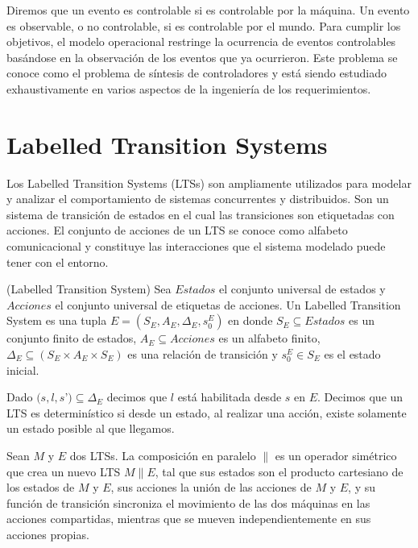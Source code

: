 Diremos que un evento es controlable si es controlable por la máquina. Un evento es observable, o no controlable, si es 
controlable por el mundo. 
Para cumplir los objetivos, el modelo operacional restringe la ocurrencia de eventos controlables basándose en la observación 
de los eventos que ya ocurrieron. 
Este problema se conoce como el problema de síntesis de controladores y está siendo estudiado exhaustivamente en varios 
aspectos de la ingeniería de los requerimientos.

\section{Labelled Transition Systems}
Los Labelled Transition Systems \cite{LTS} (LTSs) son ampliamente utilizados para modelar y analizar el comportamiento de 
sistemas concurrentes y distribuidos. Son un sistema de transición de estados en el cual las transiciones son etiquetadas 
con acciones. El conjunto de acciones de un LTS se conoce como alfabeto comunicacional y constituye las interacciones que 
el sistema modelado puede tener con el entorno.

\begin{definition}{(Labelled Transition System)}
Sea $Estados$ el conjunto universal de estados y $Acciones$ el conjunto universal de etiquetas de acciones. Un Labelled 
Transition System es una tupla $E = (S_{E}, A_{E}, \Delta_{E}, s_{0}^{E})$ en donde $S_{E} \subseteq Estados$ es un conjunto 
finito de estados, $A_{E} \subseteq Acciones$ es un alfabeto finito, $\Delta_{E} \subseteq (S_{E} \times A_{E} \times S_{E})$ es una 
relación de transición y $s_{0}^{E} \in S_{E}$ es el estado inicial.
\end{definition}

Dado $(s, l, s$’$) \subseteq \Delta_{E}$ decimos que $l$ está habilitada desde $s$ en $E$. Decimos que un LTS es 
determinístico si desde un estado, al realizar una acción, existe solamente un estado posible al que llegamos.

Sean $M$ y $E$ dos LTSs. La composición en paralelo $\parallel$ es un operador 
simétrico que crea un nuevo LTS $M \parallel E$, 
tal que sus estados son el producto cartesiano de los estados de $M$ y $E$, sus acciones la unión de las acciones de $M$ y $E$, 
y su función de transición sincroniza el movimiento de las dos máquinas en las acciones compartidas, mientras que se 
mueven independientemente en sus acciones propias.

